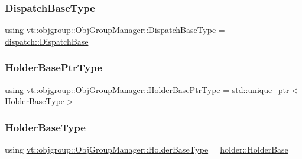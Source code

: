 \subsubsection{\texorpdfstring{Dispatch\+Base\+Type}{DispatchBaseType}}
{\footnotesize\ttfamily using \hyperlink{structvt_1_1objgroup_1_1_obj_group_manager_ae89a82f6bfca9bbd007791f1cac88f8f}{vt\+::objgroup\+::\+Obj\+Group\+Manager\+::\+Dispatch\+Base\+Type} =  \hyperlink{structvt_1_1objgroup_1_1dispatch_1_1_dispatch_base}{dispatch\+::\+Dispatch\+Base}}

\mbox{\label{structvt_1_1objgroup_1_1_obj_group_manager_ac1e9bb19d4a5923dd6d595bad28f04c9}} 
\subsubsection{\texorpdfstring{Holder\+Base\+Ptr\+Type}{HolderBasePtrType}}
{\footnotesize\ttfamily using \hyperlink{structvt_1_1objgroup_1_1_obj_group_manager_ac1e9bb19d4a5923dd6d595bad28f04c9}{vt\+::objgroup\+::\+Obj\+Group\+Manager\+::\+Holder\+Base\+Ptr\+Type} =  std\+::unique\+\_\+ptr$<$\hyperlink{structvt_1_1objgroup_1_1_obj_group_manager_a4898fc9cabf44890e5593f8c4ab86230}{Holder\+Base\+Type}$>$}

\mbox{\label{structvt_1_1objgroup_1_1_obj_group_manager_a4898fc9cabf44890e5593f8c4ab86230}} 
\subsubsection{\texorpdfstring{Holder\+Base\+Type}{HolderBaseType}}
{\footnotesize\ttfamily using \hyperlink{structvt_1_1objgroup_1_1_obj_group_manager_a4898fc9cabf44890e5593f8c4ab86230}{vt\+::objgroup\+::\+Obj\+Group\+Manager\+::\+Holder\+Base\+Type} =  \hyperlink{structvt_1_1objgroup_1_1holder_1_1_holder_base}{holder\+::\+Holder\+Base}}

